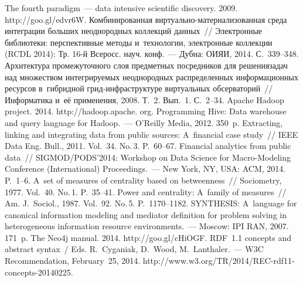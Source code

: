 \begin{multicols}{2}
{{\begin{thebibliography}{99}
 The fourth paradigm~--- data intensive scientific discovery. 
2009. {\sf http://goo.gl/edvr6W}.
 Комбинированная вир\-ту\-аль\-но-материализованная 
среда интеграции больших неоднородных коллекций данных~// Электронные библиотеки: 
перспективные методы и~технологии, электронные коллекции (RCDL 2014): Тр. 16-й 
Всеросс. науч. конф.~--- Дубна: ОИЯИ, 2014. С.~339--348.
 Архитектура промежуточного слоя 
предметных посредников для решения\linebreak задач над множеством интегрируемых 
неоднородных распределенных информационных ресурсов в~гиб\-рид\-ной  
грид-ин\-фра\-струк\-ту\-ре виртуальных обсерваторий~// Информатика и~её применения, 
2008. Т.~2. Вып.~1. С.~2--34. 
Apache Hadoop project. 2014. {\sf http://hadoop.apache. org}.
 Programming Hive: Data warehouse and query 
language for Hadoop.~--- O'Reilly Media, 2012. 350~p.
 Extracting, linking and integrating data from 
public sources: A~financial case study~// IEEE Data Eng. Bull., 2011. Vol.~34. No.\,3.  
P.~60--67.
Financial analytics from public data~// SIGMOD/PODS'2014: Workshop on Data Science for 
Macro-Modeling Conference (International) Proceedings.~--- New York, NY, USA: ACM, 2014. 
P.~1--6.
 A~set of measures of centrality based on betweenness~// Sociometry, 1977. 
Vol.~40. No.\,1. P.~35--41.
 Power and centrality: A~family of measures~// Am. J.~Sociol., 1987. 
Vol.~92. No.\,5. P.~1170--1182.
 \mbox{SYNTHESIS}: A~language for 
canonical information modeling and mediator definition for problem solving in heterogeneous 
information resource environments.~--- Moscow: IPI RAN, 2007. 171~p.
The Neo4j manual. 2014. {\sf http://goo.gl/cHiOGF}. 
RDF~1.1 concepts and abstract syntax~/
Eds. R.~Cyga\-niak, D.~Wood, M.~Lanthaler.~---  W3C Recommendation, February~25, 2014. {\sf 
http://www.w3.org/TR/2014/REC-rdf11-concepts-20140225}. 

\end{thebibliography}}}
\end{multicols}
